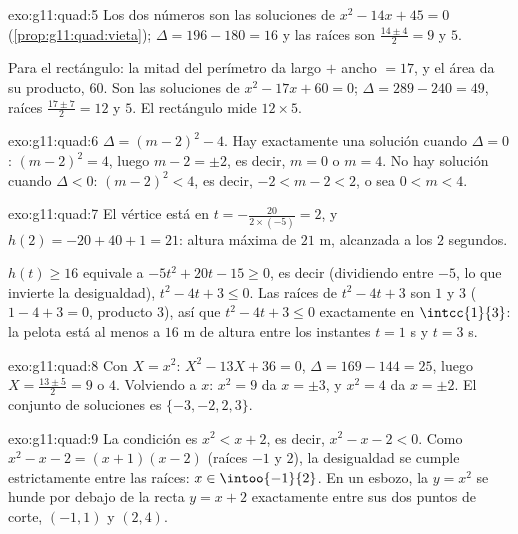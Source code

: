 \begin{solution}{exo:g11:quad:5}
Los dos números son las soluciones de $x^2 - 14x + 45 = 0$
(\cref{prop:g11:quad:vieta}); $\Delta = 196 - 180 = 16$ y las raíces son
$\frac{14 \pm 4}{2} = 9$ y $5$.

Para el rectángulo: la mitad del perímetro da largo $+$ ancho $= 17$, y el
área da su producto, $60$. Son las soluciones de $x^2 - 17x + 60 = 0$;
$\Delta = 289 - 240 = 49$, raíces $\frac{17 \pm 7}{2} = 12$ y $5$. El
rectángulo mide $12 \times 5$.
\end{solution}

\begin{solution}{exo:g11:quad:6}
$\Delta = (m-2)^2 - 4$. Hay exactamente una solución cuando $\Delta = 0$:
$(m-2)^2 = 4$, luego $m - 2 = \pm 2$, es decir, $m = 0$ o $m = 4$. No hay
solución cuando $\Delta < 0$: $(m-2)^2 < 4$, es decir, $-2 < m - 2 < 2$, o
sea $0 < m < 4$.
\end{solution}

\begin{solution}{exo:g11:quad:7}
El vértice está en $t = -\frac{20}{2 \times (-5)} = 2$, y
$h(2) = -20 + 40 + 1 = 21$: altura máxima de $21$ m, alcanzada a los $2$
segundos.

$h(t) \geq 16$ equivale a $-5t^2 + 20t - 15 \geq 0$, es decir (dividiendo
entre $-5$, lo que invierte la desigualdad), $t^2 - 4t + 3 \leq 0$. Las
raíces de $t^2-4t+3$ son $1$ y $3$ ($1 - 4 + 3 = 0$, producto $3$), así
que $t^2 - 4t + 3 \leq 0$ exactamente en $\intcc{1}{3}$: la pelota está al
menos a $16$ m de altura entre los instantes $t = 1$ s y $t = 3$ s.
\end{solution}

\begin{solution}{exo:g11:quad:8}
Con $X = x^2$: $X^2 - 13X + 36 = 0$, $\Delta = 169 - 144 = 25$, luego
$X = \frac{13 \pm 5}{2} = 9$ o $4$. Volviendo a $x$: $x^2 = 9$ da
$x = \pm 3$, y $x^2 = 4$ da $x = \pm 2$. El conjunto de soluciones es
$\{-3, -2, 2, 3\}$.
\end{solution}

\begin{solution}{exo:g11:quad:9}
La condición es $x^2 < x + 2$, es decir, $x^2 - x - 2 < 0$. Como
$x^2 - x - 2 = (x+1)(x-2)$ (raíces $-1$ y $2$), la desigualdad se cumple
estrictamente entre las raíces: $x \in \intoo{-1}{2}$. En un esbozo, la
 $y = x^2$ se hunde por debajo de la recta $y = x+2$ exactamente
entre sus dos puntos de corte, $(-1, 1)$ y $(2, 4)$.
\end{solution}

